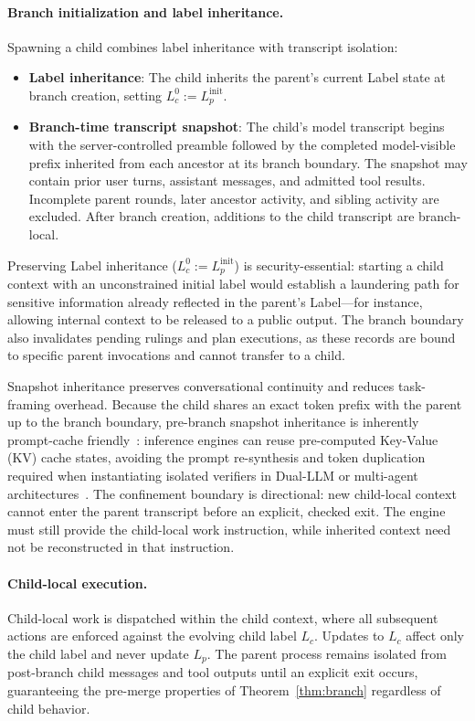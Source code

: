 \paragraph{Branch initialization and label inheritance.}
Spawning a child combines label inheritance with transcript isolation:
\begin{itemize}
  \item \textbf{Label inheritance}: The child inherits the parent's current Label state at branch creation, setting $L_c^0 := L_p^{\mathrm{init}}$.
  \item \textbf{Branch-time transcript snapshot}: The child's model transcript begins with the server-controlled preamble followed by the completed model-visible prefix inherited from each ancestor at its branch boundary. The snapshot may contain prior user turns, assistant messages, and admitted tool results. Incomplete parent rounds, later ancestor activity, and sibling activity are excluded. After branch creation, additions to the child transcript are branch-local.
\end{itemize}

Preserving Label inheritance ($L_c^0 := L_p^{\mathrm{init}}$) is security-essential: starting a child context with an unconstrained initial label would establish a laundering path for sensitive information already reflected in the parent's Label---for instance, allowing internal context to be released to a public output. The branch boundary also invalidates pending rulings and plan executions, as these records are bound to specific parent invocations and cannot transfer to a child.

Snapshot inheritance preserves conversational continuity and reduces task-framing overhead. Because the child shares an exact token prefix with the parent up to the branch boundary, pre-branch snapshot inheritance is inherently prompt-cache friendly~\cite{kwon2023efficient,zheng2023sglang}: inference engines can reuse pre-computed Key-Value (KV) cache states, avoiding the prompt re-synthesis and token duplication required when instantiating isolated verifiers in Dual-LLM or multi-agent architectures~\cite{willison2023dual,camel2025}. The confinement boundary is directional: new child-local context cannot enter the parent transcript before an explicit, checked exit. The engine must still provide the child-local work instruction, while inherited context need not be reconstructed in that instruction.

\paragraph{Child-local execution.}
Child-local work is dispatched within the child context, where all subsequent actions are enforced against the evolving child label $L_c$. Updates to $L_c$ affect only the child label and never update $L_p$. The parent process remains isolated from post-branch child messages and tool outputs until an explicit exit occurs, guaranteeing the pre-merge properties of Theorem~\ref{thm:branch} regardless of child behavior.

